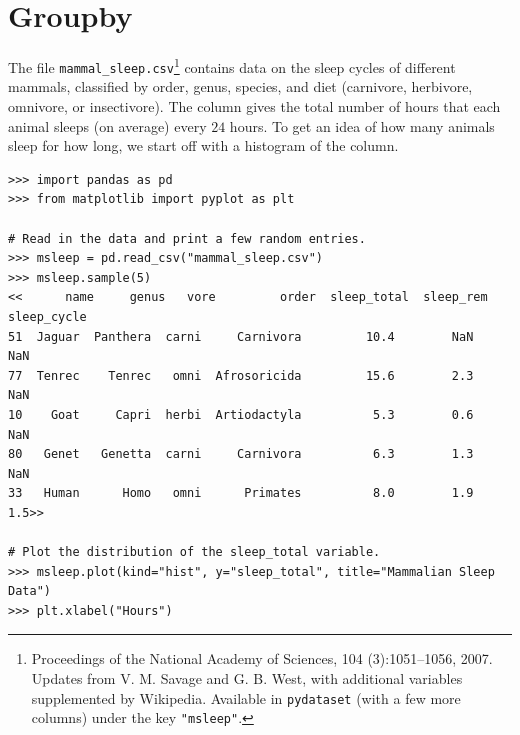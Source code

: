 
\section*{Groupby} %

The file \texttt{mammal\_sleep.csv}\footnote{Proceedings of the National Academy of Sciences, 104 (3):1051--1056, 2007.
Updates from V. M. Savage and G. B. West, with additional variables supplemented by Wikipedia.
Available in \texttt{pydataset} (with a few more columns) under the key \texttt{"msleep"}.} contains data on the sleep cycles of different mammals, classified by order, genus, species, and diet (carnivore, herbivore, omnivore, or insectivore).
The  column gives the total number of hours that each animal sleeps (on average) every $24$ hours.
To get an idea of how many animals sleep for how long, we start off with a histogram of the  column.

\begin{lstlisting}
>>> import pandas as pd
>>> from matplotlib import pyplot as plt

# Read in the data and print a few random entries.
>>> msleep = pd.read_csv("mammal_sleep.csv")
>>> msleep.sample(5)
<<      name     genus   vore         order  sleep_total  sleep_rem  sleep_cycle
51  Jaguar  Panthera  carni     Carnivora         10.4        NaN          NaN
77  Tenrec    Tenrec   omni  Afrosoricida         15.6        2.3          NaN
10    Goat     Capri  herbi  Artiodactyla          5.3        0.6          NaN
80   Genet   Genetta  carni     Carnivora          6.3        1.3          NaN
33   Human      Homo   omni      Primates          8.0        1.9          1.5>>

# Plot the distribution of the sleep_total variable.
>>> msleep.plot(kind="hist", y="sleep_total", title="Mammalian Sleep Data")
>>> plt.xlabel("Hours")
\end{lstlisting}

